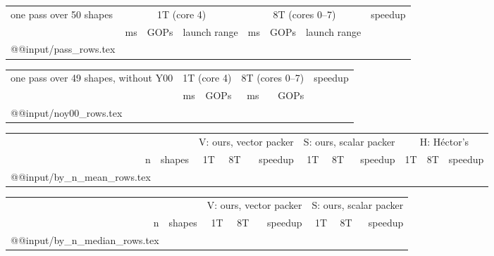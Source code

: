 \begin{center}\small
\begin{tabular}{@{}l rrc rrc r@{}}
\toprule
one pass over 50 shapes & \multicolumn{3}{c}{1T (core 4)} & \multicolumn{3}{c}{8T (cores 0--7)} & speedup \\
\cmidrule(lr){2-4}\cmidrule(lr){5-7}
 & ms & GOPs & launch range & ms & GOPs & launch range & \\
\midrule
\csname @@input\endcsname \E/pass_rows.tex
\bottomrule
\end{tabular}
\note{\runs}
\end{center}

\begin{center}\small
\begin{tabular}{@{}l rr rr r@{}}
\toprule
one pass over 49 shapes, without Y00 & \multicolumn{2}{c}{1T (core 4)} & \multicolumn{2}{c}{8T (cores 0--7)} & speedup \\
 & ms & GOPs & ms & GOPs & \\
\midrule
\csname @@input\endcsname \E/noy00_rows.tex
\bottomrule
\end{tabular}
\end{center}



\begin{center}\small\setlength\tabcolsep{4pt}
\begin{tabular}{@{}rr rrr rrr rrr@{}}
\toprule
 & & \multicolumn{3}{c}{V: ours, vector packer} & \multicolumn{3}{c}{S: ours, scalar packer} & \multicolumn{3}{c}{H: H\'ector's} \\
\cmidrule(lr){3-5}\cmidrule(lr){6-8}\cmidrule(l){9-11}
n & shapes & 1T & 8T & speedup & 1T & 8T & speedup & 1T & 8T & speedup \\
\midrule
\csname @@input\endcsname \E/by_n_mean_rows.tex
\bottomrule
\end{tabular}
\end{center}

\begin{center}\small\setlength\tabcolsep{4pt}
\begin{tabular}{@{}rr rrr rrr@{}}
\toprule
 & & \multicolumn{3}{c}{V: ours, vector packer} & \multicolumn{3}{c}{S: ours, scalar packer} \\
\cmidrule(lr){3-5}\cmidrule(l){6-8}
n & shapes & 1T & 8T & speedup & 1T & 8T & speedup \\
\midrule
\csname @@input\endcsname \E/by_n_median_rows.tex
\bottomrule
\end{tabular}
\end{center}

